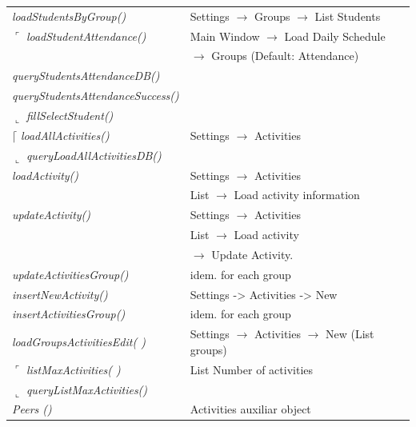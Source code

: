 \begin{bclogo}[couleur=orange!30,logo=\bcbook, arrondi=0.1,ombre=true ]
\begin{tabular}{ll}
\emph { loadStudentsByGroup()}          & { Settings  $\rightarrow$ Groups $\rightarrow$  List Students  } \\
$\ulcorner$ \emph{ loadStudentAttendance()  }      &  Main Window $\rightarrow$ Load Daily Schedule  \\
                            &   $\rightarrow$ Groups (Default: Attendance)   \\

\emph{ queryStudentsAttendanceDB() }    & {  }\\
\emph{ queryStudentsAttendanceSuccess()}&    {   }\\
$\llcorner$\emph{ fillSelectStudent() }          & {  } \\
$\lceil$ \emph { loadAllActivities() }           &{  Settings $\rightarrow$ Activities  } \\
$\llcorner$\emph { queryLoadAllActivitiesDB()}     &{   } \\
\emph { loadActivity()}                & { Settings $\rightarrow$  Activities } \\
                                        & { List  $\rightarrow$ Load activity information } \\
\emph { updateActivity()}              &  { Settings $\rightarrow$ Activities }\\ 
                                       &  { List $\rightarrow$ Load activity } \\
                                       &  { $\rightarrow$ Update Activity. } \\
%
\emph { updateActivitiesGroup() }       & {idem. for each group } \\
%
\emph { insertNewActivity() }        & {Settings -> Activities -> New }\\
\emph { insertActivitiesGroup()}       & {idem. for each group } \\
%
\emph { loadGroupsActivitiesEdit( )}    & {Settings $\rightarrow$  Activities $\rightarrow$  New (List groups) } \\
$\ulcorner$ \emph { listMaxActivities( ) }          &{ List Number of activities } \\
$\llcorner$ \emph { queryListMaxActivities() }      &{  } \\
\emph{ Peers () }                          & Activities auxiliar object \\

\end{tabular}
\end{bclogo}  


